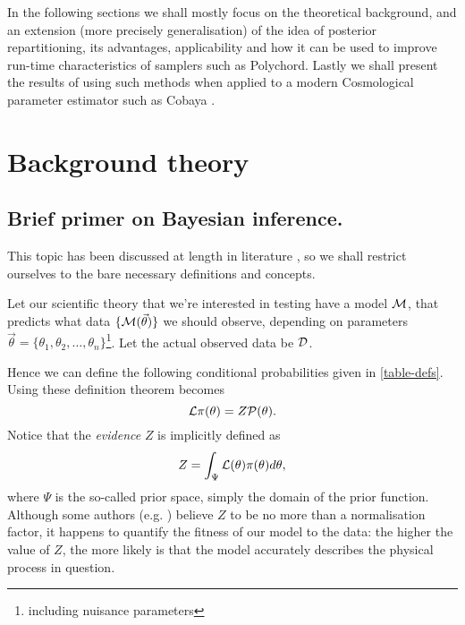 \documentclass[usenatbib]{mnras}
\begin{document}
In the following sections we shall mostly focus on the theoretical background, and an extension (more precisely generalisation) of the idea of posterior repartitioning, its advantages, applicability and how it can be used to improve run-time characteristics of samplers such as Polychord. Lastly we shall present the results of using such methods when applied to a modern Cosmological parameter estimator such as Cobaya \citep{cobaya}.

\section{Background theory}
\label{sec:org343d50c}

\subsection{Brief primer on Bayesian inference.}
\label{sec:orgee5a507}

This topic has been discussed at length in literature \citep{jeffreys2010scientific}, so we shall restrict ourselves to the bare necessary definitions and concepts. 

Let our scientific theory that we're interested in testing have a model \({\cal M}\), that predicts what data \(\lbrace {\cal M}(\vec{\theta})\rbrace\) we should observe, depending on parameters \(\vec{\theta} = \lbrace  \theta_1, \theta_2, \ldots, \theta_n \rbrace\)\footnote{including nuisance parameters}. Let the actual observed data be \({\cal D}\). 

   Hence we can define the following conditional probabilities given
in \autoref{table-defs}. Using these definition \citeauthor{1763} theorem
becomes 
\begin{equation}
{\cal L} \pi (\theta) = Z {\cal P} (\theta).
\label{eq:bayes} 
\end{equation}
Notice that the \emph{evidence} \(Z\) is
implicitly defined as 
\begin{equation} 
Z = \int_{\Psi} {\cal L}(\theta) \pi(\theta) d\theta, \label{eq:def-z}
\end{equation}
where \(\Psi\) is the so-called prior space, simply the domain of the
prior function. Although some authors
(e.g. \citeauthor{jeffreys2010scientific}) believe \(Z\) to be no more
than a normalisation factor, it happens to quantify the fitness of our
model to the data: the higher the value of \(Z\), the more likely is
that the model accurately describes the physical process in question. 
\end{document}
